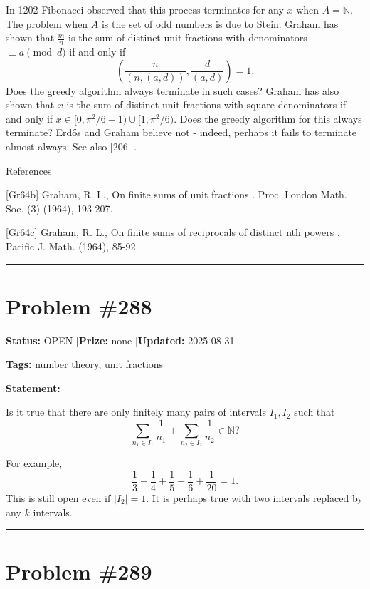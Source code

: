 \documentclass{article}
\begin{document}
In 1202 Fibonacci observed that this process terminates for any $x$ when $A=\mathbb{N}$. The problem when $A$ is the set of odd numbers is due to Stein. Graham \cite{Gr64b} has shown that $\frac{m}{n}$ is the sum of distinct unit fractions with denominators $\equiv a\pmod{d}$ if and only if\[\left(\frac{n}{(n,(a,d))},\frac{d}{(a,d)}\right)=1.\]Does the greedy algorithm always terminate in such cases? Graham \cite{Gr64c} has also shown that $x$ is the sum of distinct unit fractions with square denominators if and only if $x\in [0,\pi^2/6-1)\cup [1,\pi^2/6)$. Does the greedy algorithm for this always terminate? Erd\H{o}s and Graham believe not - indeed, perhaps it fails to terminate almost always. See also [206] .




References

[Gr64b] Graham, R. L., On finite sums of unit fractions . Proc. London Math. Soc. (3) (1964), 193-207.

[Gr64c] Graham, R. L., On finite sums of reciprocals of distinct nth powers . Pacific J. Math. (1964), 85-92.

\noindent\rule{\linewidth}{0.4pt}


\section{Problem \#288}
\label{prob:288}

\noindent\textbf{Status:} OPEN \quad|\quad \textbf{Prize:} none \quad|\quad \textbf{Updated:} 2025-08-31

\noindent\textbf{Tags:} number theory, unit fractions

\medskip

\noindent\textbf{Statement:}

Is it true that there are only finitely many pairs of intervals $I_1,I_2$ such that\[\sum_{n_1\in I_1}\frac{1}{n_1}+\sum_{n_2\in I_2}\frac{1}{n_2}\in \mathbb{N}?\]




For example,\[\frac{1}{3}+\frac{1}{4}+\frac{1}{5}+\frac{1}{6}+\frac{1}{20}=1.\]This is still open even if $\lvert I_2\rvert=1$. It is perhaps true with two intervals replaced by any $k$ intervals.

\noindent\rule{\linewidth}{0.4pt}


\section{Problem \#289}
\label{prob:289}
\end{document}
